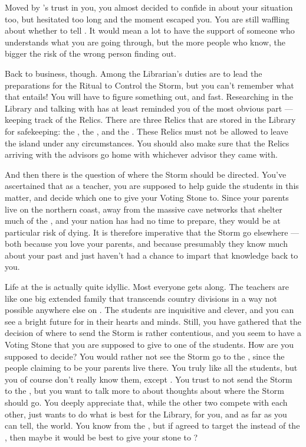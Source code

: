\documentclass[char]{GL2020}
\begin{document}
Moved by \cChupAvenger{}’s trust in you, you almost decided to confide in \cChupAvenger{\them} about your situation too, but hesitated too long and the moment escaped you. You are still waffling about whether to tell \cChupAvenger{\them}. It would mean a lot to have the support of someone who understands what you are going through, but the more people who know, the bigger the risk of the wrong person finding out.

Back to business, though. Among the Librarian's duties are to lead the preparations for the Ritual to Control the Storm, but you can't remember what that entails! You will have to figure something out, and fast. Researching in the Library and talking with \cInterpol{} has at least reminded you of the most obvious part — keeping track of the Relics. There are three Relics that are stored in the Library for safekeeping: the \iNet{}, the \iLariat{}, and the \iScythe{}. These Relics must not be allowed to leave the island under any circumstances. You should also make sure that the Relics arriving with the advisors go home with whichever advisor they came with. 

And then there is the question of where the Storm should be directed. You've ascertained that as a teacher, you are supposed to help guide the students in this matter, and decide which one to give your Voting Stone to. Since your parents live on the northern coast, away from the massive cave networks that shelter much of the \pTech{}, and your nation has had no time to prepare, they would be at particular risk of dying. It is therefore imperative that the Storm go elsewhere — both because you love your parents, and because presumably they know much about your past and just haven't had a chance to impart that knowledge back to you.

Life at the \pSchool{} is actually quite idyllic. Most everyone gets along. The teachers are like one big extended family that transcends country divisions in a way not possible anywhere else on \pEarth{}. The students are inquisitive and clever, and you can see a bright future for \pEarth{} in their hearts and minds. Still, you have gathered that the decision of where to send the Storm is rather contentious, and you seem to have a Voting Stone that you are supposed to give to one of the students. How are you supposed to decide? You would rather not see the Storm go to the \pTech{}, since the people claiming to be your parents live there. You truly like all the \cTech{} students, but you of course don’t really know them, except \cAmbition{}. You trust \cAmbition{} to not send the Storm to the \pTech{}, but you want to talk more to \cPresident{} about \cPresident{\their} thoughts about where the Storm should go. You deeply appreciate that, while the other two compete with each other, \cPresident{} just wants to do what is best for the Library, for you, and as far as you can tell, the world. You know \cPresident{\they} \cPresident{\are} from the \pShip{}, but if \cPresident{} agreed to target the \pFarm{} instead of the \pTech{}, then maybe it would be best to give your stone to \cPresident{\them}?
\end{document}
